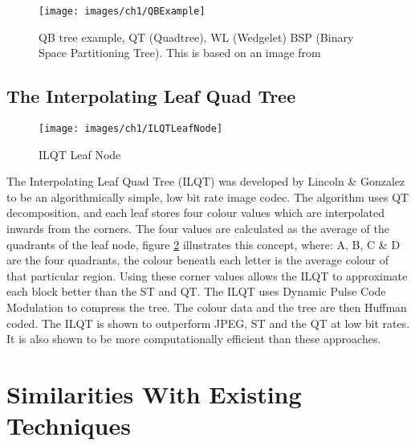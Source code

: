 \begin{figure}[!h]
\centering
\texttt{[image: images/ch1/QBExample]}
\caption{QB tree example, QT (Quadtree), WL (Wedgelet) BSP (Binary Space Partitioning Tree). This is based on an image from \cite{Kassim09Hierarchical}}
\label{QBExample}
\end{figure}

\subsection{The Interpolating Leaf Quad Tree}

\begin{figure}[!h]
\centering
\texttt{[image: images/ch1/ILQTLeafNode]}
\caption{ILQT Leaf Node}
\label{ILQTLeafNode}
\end{figure}

The Interpolating Leaf Quad Tree (ILQT) was developed by Lincoln \& Gonzalez \cite{Lincoln13Interpolating} to be an algorithmically simple, low bit rate image codec. The algorithm uses QT decomposition, and each leaf stores four colour values which are interpolated inwards from the corners. The four values are calculated as the average of the quadrants of the leaf node, figure \ref{ILQTLeafNode} illustrates this concept, where: A, B, C \& D are the four quadrants, the colour beneath each letter is the average colour of that particular region. Using these corner values allows the ILQT to approximate each block better than the ST and QT. The ILQT uses Dynamic Pulse Code Modulation to compress the tree. The colour data and the tree are then Huffman coded. The ILQT is shown to outperform JPEG, ST and the QT \cite{Varma12Application} at low bit rates. It is also shown to be more computationally efficient than these approaches. 

\section{Similarities With Existing Techniques}

